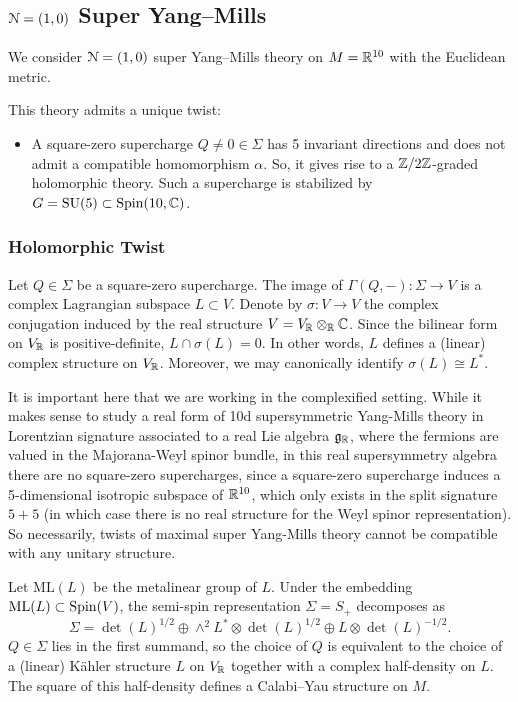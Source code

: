 \documentclass[10pt, oneside]{article}
\newcommand{\ML}{\mathrm{ML}}
\begin{document}
\subsection{\texorpdfstring{$\mathcal N=(1, 0)$}{N=(1,0)} Super Yang--Mills}

We consider $\mathcal N=(1, 0)$ super Yang--Mills theory on $M=\mathbb R^{10}$ with the Euclidean metric.

This theory admits a unique twist:
\begin{itemize}
\item A square-zero supercharge $Q\neq 0\in\Sigma$ has 5 invariant directions and does not admit a compatible homomorphism $\alpha$. So, it gives rise to a $\mathbb Z/2\mathbb Z$-graded holomorphic theory. Such a supercharge is stabilized by $G=\mathrm{SU}(5)\subset \mathrm{Spin}(10, \mathbb C)$.
\end{itemize}

\subsubsection{Holomorphic Twist}
\label{sect:10dholomorphictwist}

Let $Q\in\Sigma$ be a square-zero supercharge. The image of $\Gamma(Q, -)\colon \Sigma\rightarrow V$ is a complex Lagrangian subspace $L\subset V$. Denote by $\sigma\colon V\rightarrow V$ the complex conjugation induced by the real structure $V = V_\mathbb R\otimes_\mathbb R\mathbb C$. Since the bilinear form on $V_\mathbb R$ is positive-definite, $L\cap \sigma(L) = 0$. In other words, $L$ defines a (linear) complex structure on $V_\mathbb R$. Moreover, we may canonically identify $\sigma(L)\cong L^*$.

\begin{remark}
It is important here that we are working in the complexified setting.  While it makes sense to study a real form of 10d supersymmetric Yang-Mills theory in Lorentzian signature associated to a real Lie algebra $\mathfrak{g}_\mathbb R$, where the fermions are valued in the Majorana-Weyl spinor bundle, in this real supersymmetry algebra there are no square-zero supercharges, since a square-zero supercharge induces a 5-dimensional isotropic subspace of $\mathbb R^{10}$, which only exists in the split signature $5+5$ (in which case there is no real structure for the Weyl spinor representation).  So necessarily, twists of maximal super Yang-Mills theory cannot be compatible with any unitary structure.
\end{remark}

Let $\ML(L)$ be the metalinear group of $L$. Under the embedding $\ML(L)\subset \Spin(V)$, the semi-spin representation $\Sigma=S_+$ decomposes as
\[\Sigma = \det(L)^{1/2} \oplus \wedge^2 L^*\otimes \det(L)^{1/2}\oplus L\otimes \det(L)^{-1/2}.\]
$Q\in\Sigma$ lies in the first summand, so the choice of $Q$ is equivalent to the choice of a (linear) K\"ahler structure $L$ on $V_\mathbb R$ together with a complex half-density on $L$. The square of this half-density defines a Calabi--Yau structure on $M$.
\end{document}
